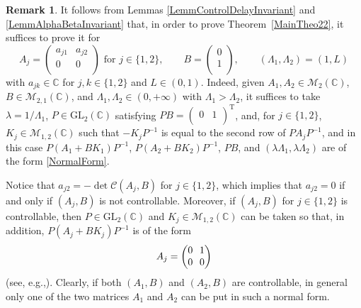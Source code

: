 \documentclass[10pt]{article}
\newcommand{\eg}{e.g.,\xspace}
\renewcommand{\eg}{e.g.,\xspace}
\theoremstyle{plain}
\theoremstyle{definition}
\newtheorem{remk}[theo]{Remark}
\newcommand{\transp}{{\scriptscriptstyle\mathrm{T}}}
\numberwithin{equation}{section}\numberwithin{figure}{section}\emergencystretch=3em
\begin{document}
\begin{remk}
\label{RemkReduction}
It follows from Lemmas \ref{LemmControlDelayInvariant} and \ref{LemmAlphaBetaInvariant} that, in order to prove Theorem~\ref{MainTheo22}, it suffices to prove it for
\begin{equation}
\label{NormalForm}
A_j = \begin{pmatrix}
a_{j1} & a_{j2} \\
0 & 0 \\
\end{pmatrix} \text{ for } j \in \{1, 2\}, \qquad B = \begin{pmatrix}
0 \\
1 \\
\end{pmatrix}, \qquad (\Lambda_1, \Lambda_2) = (1, L)
\end{equation}
with $a_{jk} \in \mathbb C$ for $j, k \in \{1, 2\}$ and $L \in (0, 1)$. Indeed, given $A_1, A_2 \in \mathcal M_2(\mathbb C)$, $B \in \mathcal M_{2, 1}(\mathbb C)$, and $\Lambda_1, \Lambda_2 \in (0, +\infty)$ with $\Lambda_1 > \Lambda_2$, it suffices to take $\lambda = 1/\Lambda_1$, $P \in \mathrm{GL}_2(\mathbb C)$ satisfying $P B = \begin{pmatrix}0 & 1 \\\end{pmatrix}^\transp$, and, for $j \in \{1, 2\}$, $K_j \in \mathcal M_ {1, 2}(\mathbb C)$ such that $-K_j P^{-1}$ is equal to the second row of $P A_j P^{-1}$, and in this case $P(A_1 + B K_1)P^{-1}$, \hbox{$P(A_2 + B K_2)P^{-1}$}, $P B$, and $(\lambda \Lambda_1, \lambda \Lambda_2)$ are of the form \eqref{NormalForm}.

Notice that $a_{j2} = -\det\mathcal C(A_j, B)$ for $j \in \{1, 2\}$, which implies that $a_{j2} =0$ if and only if $(A_j,B)$ is not controllable.
Moreover, if $(A_j,B)$ for $j\in\{1,2\}$ is controllable, then $P \in \mathrm{GL}_2(\mathbb C)$ and $K_j \in \mathcal M_{1, 2}(\mathbb C)$ can be taken so that, in addition,
\hbox{$P (A_j + B K_j) P^{-1}$} is of the form
\begin{equation*}\arraycolsep3.5pt
A_j = \begin{pmatrix}
0 & 1 \\
0 & 0 \\
\end{pmatrix} \end{equation*}
(see, \eg \cite[Def.\,5.1.5]{Sontag1998Mathematical}). Clearly, if both $(A_1,B)$ and $(A_2,B)$ are controllable, in general only one of the two matrices $A_1$ and $A_2$ can be put in such a normal form.


\end{remk}
\end{document}
